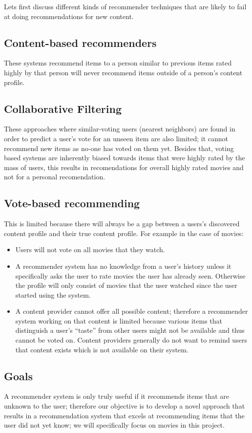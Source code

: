 Lets first discuss different kinds of recommender techniques that are likely to fail at doing recommendations for new content. 

\subsection{Content-based recommenders}
These systems recommend items to a person similar to previous items rated highly by
that person will never recommend items outside of a person’s content profile.

\subsection{Collaborative Filtering}
These approaches where similar-voting users (nearest neighbors) are found in order to predict a
user’s vote for an unseen item are also limited; it cannot recommend new items as no-one has voted on them yet.
Besides that, voting based systems are inherently biased towards items that were highly rated by the mass of
users, this results in recomendations for overall highly rated movies and not for a personal recomendation.

\subsection{Vote-based recommending}
This is limited because there will always be a gap between a users’s discovered content
profile and their true content profile. For example in the case of movies:
\begin{itemize}
	\item Users will not vote on all movies that they watch.
	\item A recommender system has no knowledge from a user’s history unless it specifically asks the user to rate
movies the user has already seen. Otherwise the profile will only consist of movies that the user watched
since the user started using the system.
	\item A content provider cannot offer all possible content; therefore a recommender system working on that
content is limited because various items that distinguish a user’s “taste” from other users might not be
available and thus cannot be voted on. Content providers generally do not want to remind users that
content exists which is not available on their system.
\end{itemize}


\subsection{Goals}
\label{sec:intro:goals}
A recommender system is only truly useful if it recommends items that are unknown to the user; therefore our
objective is to develop a novel approach that results in a recommendation system that excels at recommending items
that the user did not yet know; we will specifically focus on movies in this project.

